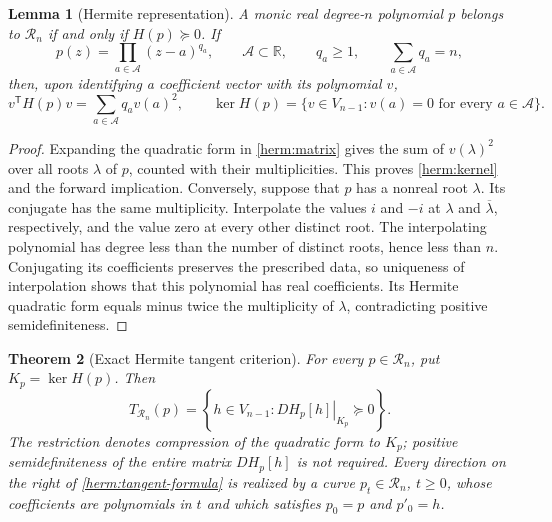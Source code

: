 \documentclass[reqno]{amsart}
\newtheorem{theorem}{Theorem}[section]
\newtheorem{lemma}[theorem]{Lemma}
\theoremstyle{definition}
\theoremstyle{remark}
\newcommand{\R}{\mathbb R}
\begin{document}
\begin{lemma}[Hermite representation]
\label{herm:representation}
A monic real degree-$n$ polynomial $p$ belongs to $\mathcal R_n$ if and
only if $H(p)\succeq0$.  If
\begin{equation}
 p(z)=\prod_{a\in\mathcal A}(z-a)^{q_a},
 \qquad \mathcal A\subset\R,\qquad
 q_a\geq1,\qquad \sum_{a\in\mathcal A}q_a=n,
 \label{herm:factorization}
\end{equation}
then, upon identifying a coefficient vector with its polynomial $v$,
\begin{equation}
 v^{\mathsf T}H(p)v=\sum_{a\in\mathcal A}q_a v(a)^2,
 \qquad
 \ker H(p)=\{v\in V_{n-1}:v(a)=0\text{ for every }a\in\mathcal A\}.
 \label{herm:kernel}
\end{equation}
\end{lemma}

\begin{proof}
Expanding the quadratic form in \eqref{herm:matrix} gives the sum of
$v(\lambda)^2$ over all roots $\lambda$ of $p$, counted with their
multiplicities.  This proves \eqref{herm:kernel} and the forward
implication.  Conversely, suppose that $p$ has a nonreal root $\lambda$.
Its conjugate has the same multiplicity.  Interpolate the values $i$ and
$-i$ at $\lambda$ and $\overline\lambda$, respectively, and the value
zero at every other distinct root.  The interpolating polynomial has
degree less than the number of distinct roots, hence less than $n$.
Conjugating its coefficients preserves the prescribed data, so uniqueness
of interpolation shows that this polynomial has real coefficients.
Its Hermite quadratic form equals minus twice the multiplicity of
$\lambda$, contradicting positive semidefiniteness.
\end{proof}

\begin{theorem}[Exact Hermite tangent criterion]
\label{herm:tangent}
For every $p\in\mathcal R_n$, put $K_p=\ker H(p)$.  Then
\begin{equation}
 \boxed{\displaystyle
 T_{\mathcal R_n}(p)=
 \left\{h\in V_{n-1}:
       \left.DH_p[h]\right|_{K_p}\succeq0\right\}.}
 \label{herm:tangent-formula}
\end{equation}
The restriction denotes compression of the quadratic form to $K_p$;
positive semidefiniteness of the entire matrix $DH_p[h]$ is not required.
Every direction on the right of \eqref{herm:tangent-formula} is realized
by a curve $p_t\in\mathcal R_n$, $t\geq0$, whose coefficients are
polynomials in $t$ and which satisfies $p_0=p$ and $p'_0=h$.
\end{theorem}
\end{document}
